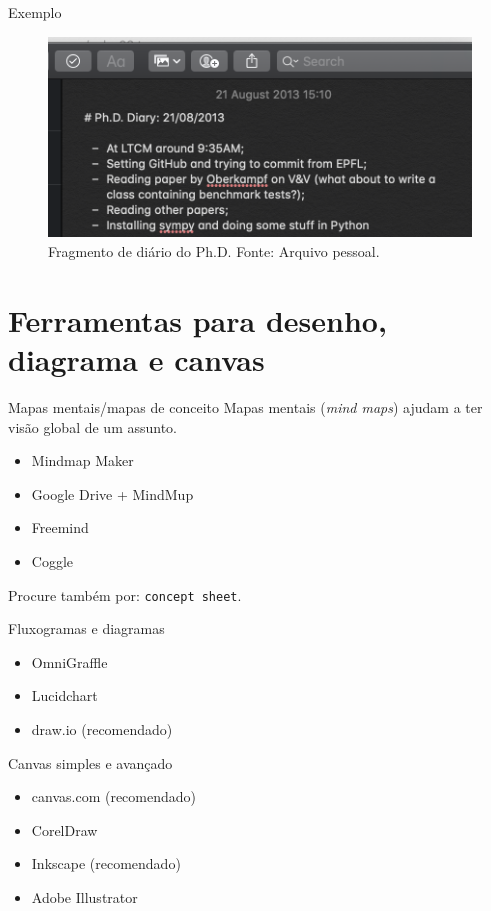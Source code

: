 \begin{frame}{Exemplo}
\begin{figure}
\centering
\includegraphics[scale=0.5]{figs/02/diario}
\caption{Fragmento de diário do Ph.D. Fonte: Arquivo pessoal.}
\end{figure}
\end{frame}

\section{Ferramentas para desenho, diagrama e canvas}

\begin{frame}{Mapas mentais/mapas de conceito}
Mapas mentais (\textit{mind maps}) ajudam a ter visão global de um assunto.
\begin{itemize}
\item Mindmap Maker
\item Google Drive + MindMup
\item Freemind
\item Coggle
\end{itemize}

Procure também por: \texttt{concept sheet}.
\end{frame}


\begin{frame}{Fluxogramas e diagramas}
\begin{itemize}
\item OmniGraffle 
\item Lucidchart
\item draw.io (recomendado)
\end{itemize}
\end{frame}

\begin{frame}{Canvas simples e avançado}
\begin{itemize}
\item canvas.com (recomendado)
\item CorelDraw
\item Inkscape (recomendado)
\item Adobe Illustrator
\end{itemize}
\end{frame}

